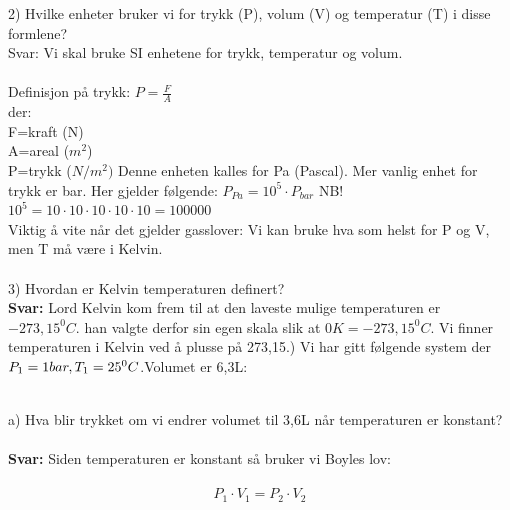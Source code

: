\documentclass[12pt,a4paper]{article}
\begin{document}
2) Hvilke enheter bruker vi for trykk (P), volum (V) og temperatur (T) i disse formlene?\\
Svar: Vi skal bruke SI enhetene for trykk, temperatur og volum.  \\\\
Definisjon på trykk: $P=\frac{F}{A}$ \\
der:\\
F=kraft (N)\\
A=areal ($m^2$)\\
P=trykk ($N/m^2)$ Denne enheten kalles for Pa (Pascal). Mer vanlig enhet for trykk er bar.  Her gjelder følgende: $P_{Pa} = 10^5\cdot P_{bar}$  NB! $10^5=10\cdot 10\cdot 10\cdot 10\cdot10=100000$\\
Viktig å vite når det gjelder gasslover: Vi kan bruke hva som helst for P og V, men T må være i Kelvin. \\\\
3) Hvordan er Kelvin temperaturen definert?\\
\textbf{Svar:} Lord Kelvin kom frem til at den laveste mulige temperaturen er $-273,15^0C$.  han valgte derfor sin egen skala slik at $0K=-273,15^0C$.  Vi finner temperaturen i Kelvin ved å plusse på 273,15.\newpage{}) Vi har gitt følgende system der $P_1=1bar,
    \\ T_1=25^0C$.\quad Volumet er 6,3L:
     \begin{figure}[h]
    \vspace{2cm}  %
\end{figure}\\

\noindent a) Hva blir trykket om vi endrer volumet til 3,6L når temperaturen er konstant?\\\\
\textbf{Svar:} Siden temperaturen er konstant så bruker vi Boyles lov:\\\\
    $$P_1\cdot V_1=P_2 \cdot V_2$$
\end{document}
